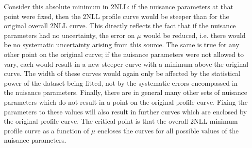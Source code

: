 Consider this absolute minimum in 2NLL: if the nuisance parameters at that
point were fixed, then the 2NLL profile curve would be steeper than for
the original overall 2NLL curve. This directly reflects the fact that
if the nuisance parameters had no uncertainty,
the error on $\mu$ would be reduced, i.e. there would be no systematic 
uncertainty arising from this source.
The same is true for any other point on the original curve; if the nuisance
parameters were not allowed to vary, each would result in a new steeper curve
with a minimum above the original curve.
The width of these curves would again only be affected by the statistical
power of the dataset being fitted, not by the systematic errors encompassed
in the nuisance parameters.
Finally, there are in general
many other sets of nuisance parameters which do not result in a point on the
original profile curve. Fixing the parameters to these values will also result
in further curves which are enclosed by the original profile curve.
The critical point is that the overall 2NLL minimum profile curve as a function
of $\mu$ encloses the curves for all possible values of the nuisance
parameters.

